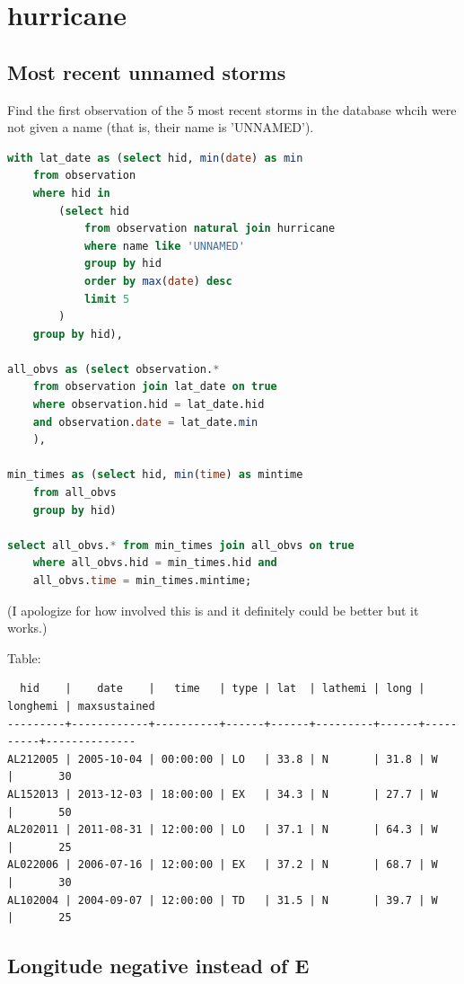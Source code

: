 \documentclass[11pt, oneside]{amsart}   	%
\begin{document}
\section{hurricane}

\subsection{Most recent unnamed storms} Find the first observation of the 5 most recent storms in the database whcih were not given a name (that is, their name is 'UNNAMED').

\begin{lstlisting}[language=SQL]
with lat_date as (select hid, min(date) as min
    from observation 
    where hid in 
        (select hid
            from observation natural join hurricane
            where name like 'UNNAMED'
            group by hid
            order by max(date) desc
            limit 5
        )
    group by hid),

all_obvs as (select observation.*
    from observation join lat_date on true 
    where observation.hid = lat_date.hid
    and observation.date = lat_date.min
    ),

min_times as (select hid, min(time) as mintime
    from all_obvs
    group by hid)

select all_obvs.* from min_times join all_obvs on true 
    where all_obvs.hid = min_times.hid and
    all_obvs.time = min_times.mintime;
\end{lstlisting}
(I apologize for how involved this is and it definitely could be better but it works.)

Table:
\begin{verbatim}
  hid    |    date    |   time   | type | lat  | lathemi | long | longhemi | maxsustained
---------+------------+----------+------+------+---------+------+----------+--------------
AL212005 | 2005-10-04 | 00:00:00 | LO   | 33.8 | N       | 31.8 | W        |       30
AL152013 | 2013-12-03 | 18:00:00 | EX   | 34.3 | N       | 27.7 | W        |       50
AL202011 | 2011-08-31 | 12:00:00 | LO   | 37.1 | N       | 64.3 | W        |       25
AL022006 | 2006-07-16 | 12:00:00 | EX   | 37.2 | N       | 68.7 | W        |       30
AL102004 | 2004-09-07 | 12:00:00 | TD   | 31.5 | N       | 39.7 | W        |       25
\end{verbatim}

\subsection{Longitude negative instead of E}
\end{document}
